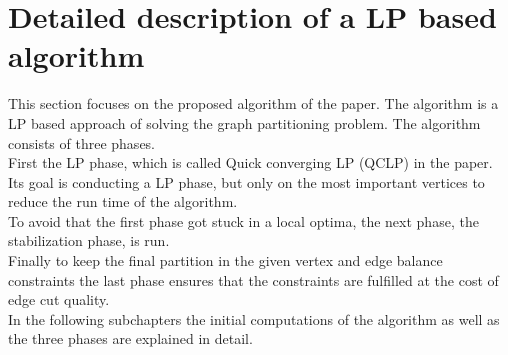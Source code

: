 \documentclass[acmsmall,nonacm,screen,review]{acmart}
\begin{document}
\section{Detailed description of a LP based algorithm}
This section focuses on the proposed algorithm of the paper. The algorithm is a LP based approach of solving the graph partitioning problem. The algorithm consists of three phases.\\
First the LP phase, which is called Quick converging LP (QCLP) in the paper. Its goal is conducting a LP phase, but only on the most important vertices to reduce the run time of the algorithm.\\
To avoid that the first phase got stuck in a local optima, the next phase, the stabilization phase, is run.\\
Finally to keep the final partition in the given vertex and edge balance constraints the last phase ensures that the constraints are fulfilled at the cost of edge cut quality.\\
In the following subchapters the initial computations of the algorithm as well as the three phases are explained in detail.
\end{document}
